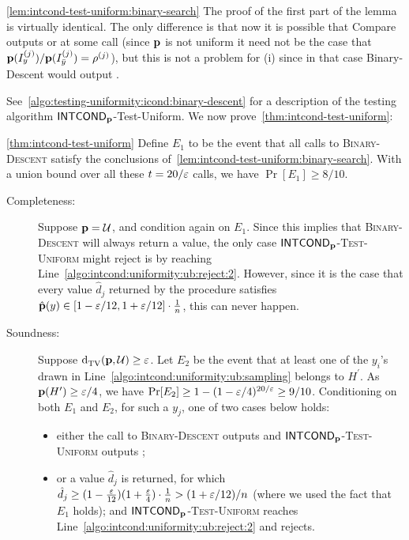\begin{proofof}{\cref{lem:intcond-test-uniform:binary-search}}
The proof of the first part of the lemma is virtually identical.  The only difference is that now
it is possible that {\sc Compare} outputs \high or \low at some call (since $\mathbf{p}$ is not uniform it need not be the case that
$\mathbf{p}(I^{(j)}_y)/\mathbf{p}(I^{(j)}_{\bar{y}}) = \rho^{(j)}$), but this is not a problem for (i) since in that case
{\sc Binary-Descent} would output \reject.
\end{proofof}


See~\cref{algo:testing-uniformity:icond:binary-descent}
for a description of the
testing algorithm {\sc ${\sf INTCOND}_{\mathbf{p}}$-Test-Uniform}.
We now prove~\cref{thm:intcond-test-uniform}:

\begin{proofof}{\cref{thm:intcond-test-uniform}}
Define $E_1$ to be the event that all calls to \textsc{Binary-Descent} satisfy the conclusions of~\cref{lem:intcond-test-uniform:binary-search}. With a union bound over all these $t=20/\varepsilon$ calls, we have $\Pr[E_1] \geq 8/10$.
\begin{description}

  \item[Completeness:] Suppose $\mathbf{p}=\mathcal{U}$, and condition again on $E_1$.
Since this implies that \textsc{Binary-Descent} will always return a
value, the only case \textsc{${\sf INTCOND}_{\mathbf{p}}$-Test-Uniform} might reject is
by reaching Line~\ref{algo:intcond:uniformity:ub:reject:2}. However,
since it is the case that every value $\hat{d}_j$ returned by the
procedure satisfies \mbox{$\hat{\mathbf{p}}(y)\in[1-\varepsilon/12, 1+\varepsilon/12]\cdot
\frac{1}{n}$},
this can never happen.

  \item[Soundness:] Suppose ${\operatorname{d}_{\textrm{TV}}^{}\!\left({\mathbf{p}, \mathcal{U}}\right)} \geq \varepsilon$.
Let $E_2$ be the event that at least one of the $y_i$'s drawn in
Line~\ref{algo:intcond:uniformity:ub:sampling} belongs to $H^\prime$.
As $\mathbf{p}(H') \geq \varepsilon/4$, we have
$\Pr[E_2] \geq 1-(1 - \varepsilon/4)^{20/\varepsilon} \geq 9/10$.
Conditioning on both $E_1$ and $E_2$, for such a $y_j$, one of two cases below holds:
  \begin{itemize}

    \item either the call to \textsc{Binary-Descent} outputs \reject and \textsc{${\sf INTCOND}_{\mathbf{p}}$-Test-Uniform}  outputs \reject;

   \item or a value $\hat{d}_j$ is returned, for which
      $\hat{d}_j \geq (1-\frac{\varepsilon}{12})(1+\frac{\varepsilon}{4})\cdot \frac{1}{n} > (1+\varepsilon/12)/n$
    (where we used the fact that $E_1$ holds); and \textsc{${\sf INTCOND}_{\mathbf{p}}$-Test-Uniform} reaches Line~\ref{algo:intcond:uniformity:ub:reject:2} and rejects.


\end{itemize}
\end{description}
\end{proofof}
